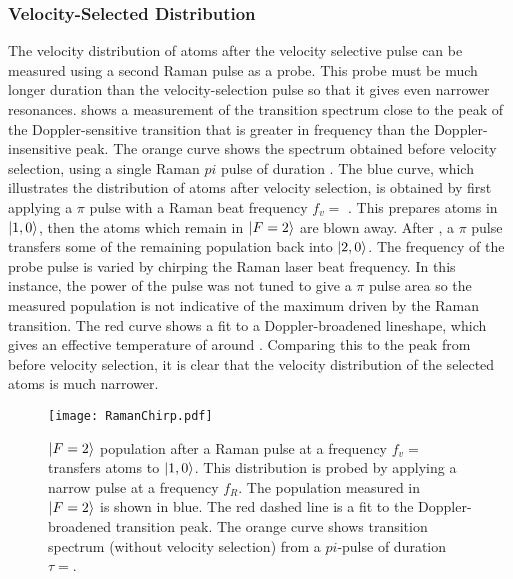 \subsubsection{Velocity-Selected Distribution}
The velocity distribution of atoms after the velocity selective pulse
can be measured using a second Raman pulse as a probe. This probe must
be much longer duration than
the velocity-selection pulse so that it gives even narrower
resonances. 
 shows a measurement of the transition
spectrum close to the peak of the Doppler-sensitive transition that is
greater in frequency than the Doppler-insensitive peak. The orange
curve shows the spectrum obtained before velocity selection, using a single Raman $pi$ pulse of
duration . The blue curve, which illustrates the
distribution of atoms after velocity selection, is obtained by first
applying a
 \(\pi\) pulse with a Raman beat frequency
\(f_v = \) . This prepares atoms in
\(\ket{1,0}\), then the atoms which remain in
\(\ket{F=2}\) are blown away. After , a
 \(\pi\) pulse transfers some of the
remaining population back into \(\ket{2,0}\). The frequency of the
probe pulse is varied by chirping the Raman laser beat frequency. In
this instance, the power of the  pulse was not tuned to give a \(\pi\)
pulse area so the measured population is not indicative of the maximum
driven by the Raman transition. The red curve shows a fit to a
Doppler-broadened lineshape, which gives an effective temperature
of around . Comparing this to the peak from
before velocity selection, it is clear that the velocity
distribution of the selected atoms is much narrower. 
\begin{figure}[htpb!]
  \centering
  \texttt{[image: RamanChirp.pdf]}
  \caption[$\ket{F=2}$ population after a velocity-selective Raman
  $\pi$ pulse.]{\(\ket{F=2}\) population after a Raman pulse at a frequency
    \(f_v =\) transfers atoms to
    \(\ket{1,0}\). This distribution is probed by
  applying a narrow pulse at a frequency \(f_{R}\). The population
measured in \(\ket{F=2}\) is shown in blue. The red dashed line is a
fit to the Doppler-broadened
transition peak. The orange curve shows
transition spectrum (without velocity selection) from a $pi$-pulse
of duration \(\tau = \).}
  \label{fig:vel_select_chirp}
\end{figure}
